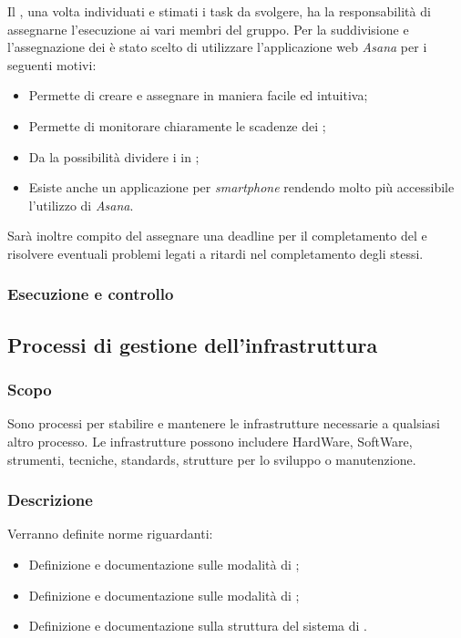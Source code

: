 \documentclass[12pt,a4paper]{article}
\begin{document}
Il \PM{}, una volta individuati e stimati i task da svolgere, ha la responsabilità di assegnarne l'esecuzione ai vari membri del gruppo.
Per la suddivisione e l'assegnazione dei \textit{} è stato scelto di utilizzare l'applicazione web \textit{Asana} per i seguenti motivi:
 \begin{itemize}
  \item Permette di creare e assegnare \textit{} in maniera facile ed intuitiva;
  \item Permette di monitorare chiaramente le scadenze dei \textit{};
  \item Da la possibilità dividere i \textit{} in \textit{};
  \item Esiste anche un applicazione per \textit{smartphone} rendendo molto più accessibile l'utilizzo di \textit{Asana}.
\end{itemize}
Sarà inoltre compito del \PM{} assegnare una deadline per il completamento del \textit{} e risolvere eventuali problemi legati a ritardi nel completamento degli stessi.


\subsubsection{Esecuzione e controllo} %

\newpage

\subsection{Processi di gestione dell'infrastruttura} %
\subsubsection{Scopo} 
Sono processi per stabilire e mantenere le infrastrutture necessarie a qualsiasi altro processo. Le infrastrutture  possono includere HardWare, SoftWare, strumenti, tecniche, standards, strutture per lo sviluppo o manutenzione.

\subsubsection{Descrizione} 
Verranno definite norme riguardanti:
\begin{itemize}
  \item Definizione e documentazione sulle modalità di \textit{} ;
  \item Definizione e documentazione sulle modalità di \textit{};
  \item Definizione e documentazione sulla struttura del sistema di \textit{}.
\end{itemize}
\end{document}
